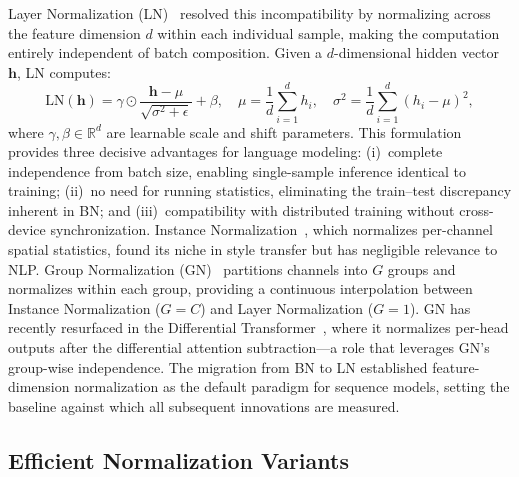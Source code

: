 Layer Normalization (LN)~\cite{ba2016layer} resolved this incompatibility by normalizing across the feature dimension $d$ within each individual sample, making the computation entirely independent of batch composition.
Given a $d$-dimensional hidden vector $\mathbf{h}$, LN computes:
\begin{equation}
    \text{LN}(\mathbf{h}) = \gamma \odot \frac{\mathbf{h} - \mu}{\sqrt{\sigma^2 + \epsilon}} + \beta, \quad \mu = \frac{1}{d}\sum_{i=1}^{d} h_i, \quad \sigma^2 = \frac{1}{d}\sum_{i=1}^{d}(h_i - \mu)^2,
\end{equation}
where $\gamma, \beta \in \mathbb{R}^d$ are learnable scale and shift parameters.
This formulation provides three decisive advantages for language modeling: (i)~complete independence from batch size, enabling single-sample inference identical to training; (ii)~no need for running statistics, eliminating the train--test discrepancy inherent in BN; and (iii)~compatibility with distributed training without cross-device synchronization.
Instance Normalization~\cite{ulyanov2016instance}, which normalizes per-channel spatial statistics, found its niche in style transfer but has negligible relevance to NLP.
Group Normalization (GN)~\cite{wu2018group} partitions channels into $G$ groups and normalizes within each group, providing a continuous interpolation between Instance Normalization ($G=C$) and Layer Normalization ($G=1$).
GN has recently resurfaced in the Differential Transformer~\cite{ye2024differential}, where it normalizes per-head outputs after the differential attention subtraction---a role that leverages GN's group-wise independence.
The migration from BN to LN established feature-dimension normalization as the default paradigm for sequence models, setting the baseline against which all subsequent innovations are measured.

\subsection{Efficient Normalization Variants}

